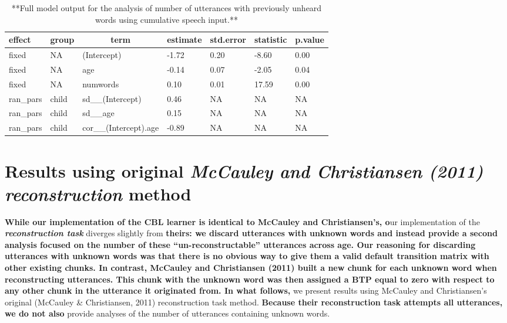 \documentclass[man,mask,floatsintext]{apa6}
\begin{document}
\begin{table}[tbp]
\begin{center}
\begin{threeparttable}
\caption{\label{tab:tab-unseen_words-cumu-MAIN}**Full model output for the analysis of number of utterances with previously unheard words using cumulative speech input.**}
\begin{tabular}{lllllll}
\toprule
effect & \multicolumn{1}{c}{group} & \multicolumn{1}{c}{term} & \multicolumn{1}{c}{estimate} & \multicolumn{1}{c}{std.error} & \multicolumn{1}{c}{statistic} & \multicolumn{1}{c}{p.value}\\
\midrule
fixed & NA & (Intercept) & -1.72 & 0.20 & -8.60 & 0.00\\
fixed & NA & age & -0.14 & 0.07 & -2.05 & 0.04\\
fixed & NA & numwords & 0.10 & 0.01 & 17.59 & 0.00\\
ran\_pars & child & sd\_\_(Intercept) & 0.46 & NA & NA & NA\\
ran\_pars & child & sd\_\_age & 0.15 & NA & NA & NA\\
ran\_pars & child & cor\_\_(Intercept).age & -0.89 & NA & NA & NA\\
\bottomrule
\end{tabular}
\end{threeparttable}
\end{center}
\end{table}

\pagebreak

\section{\texorpdfstring{Results using original \emph{McCauley and
Christiansen (2011) reconstruction}
method}{Results using original McCauley and Christiansen (2011) reconstruction method}}\label{results-using-original-mccauley-and-christiansen-2011-reconstruction-method}

\textbf{While our implementation of the CBL learner is identical to
McCauley and Christiansen's, o}ur implementation of the
\textbf{\emph{reconstruction task}} diverges slightly from
\textbf{theirs: we discard utterances with unknown words and instead
provide a second analysis focused on the number of these
\enquote{un-reconstructable} utterances across age. Our reasoning for
discarding utterances with unknown words was that there is no obvious
way to give them a valid default transition matrix with other existing
chunks. In contrast, McCauley and Christiansen (2011) built a new chunk
for each unknown word when reconstructing utterances. This chunk with
the unknown word was then assigned a BTP equal to zero with respect to
any other chunk in the utterance it originated from. In what follows,}
we present results using McCauley and Christiansen's original (McCauley
\& Christiansen, 2011) reconstruction task method. \textbf{Because their
reconstruction task attempts all utterances, we do not also} provide
analyses of the number of utterances containing unknown words.
\end{document}
